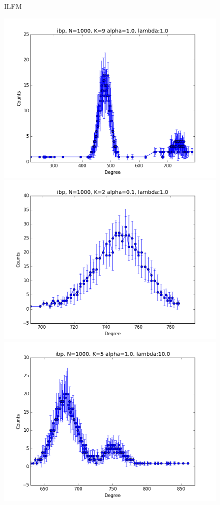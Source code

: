 \begin{figure}[ht]
    \vspace{0.2cm}
	 ILFM

	\includegraphics[scale=0.27]{img/ilfm/1/figure_1}
	\endminipage
	\includegraphics[scale=0.27]{img/ilfm/2/figure_1}
	\endminipage
	\includegraphics[scale=0.27]{img/ilfm/3/figure_1}

\end{figure}
